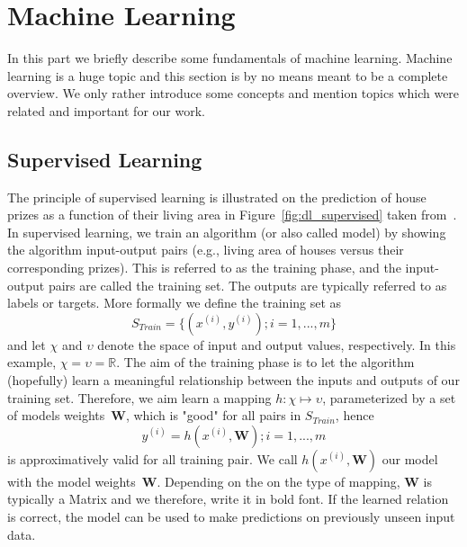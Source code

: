 \section{Machine Learning} \label{sec:intro_mlearn} %
In this part we briefly describe some fundamentals of machine learning. Machine learning is a huge topic and this section is by no means meant to be a complete overview. We only rather introduce some concepts and mention topics which were related and important for our work.

\subsection{Supervised Learning} \label{sec:ml_supervised}
The principle of supervised learning is illustrated on the prediction of house prizes as a function of their living area in Figure~\ref{fig:dl_supervised} taken from~\cite{Ng2012StanfordNotes}. In supervised learning, we train an algorithm (or also called model) by showing the algorithm input-output pairs (e.g., living area of houses versus their corresponding prizes). This is referred to as the training phase, and the input-output pairs are called the training set. The outputs are typically referred to as labels or targets. More formally we define the training set as
\begin{equation}
   S_{Train} = \{(x^{(i)}, y^{(i)}); i = 1,...,m\}
   \label{eq:training_set}
\end{equation}
and let $\chi$ and $\upsilon$ denote the space of input and output values, respectively. In this example, $\chi = \upsilon = \mathbb{R}$. The aim of the training phase is to let the algorithm (hopefully) learn a meaningful relationship between the inputs and outputs of our training set. Therefore, we aim learn a mapping $h : \chi \mapsto \upsilon$, parameterized by a set of models weights~$\textbf{W}$, which is "good" for all pairs in $S_{Train}$, hence
\begin{equation}
   y^{(i)} = h(x^{(i)}, \mathbf{W}); i = 1,...,m
   \label{eq:model}
\end{equation}
is approximatively valid for all training pair. We call $h(x^{(i)}, \mathbf{W})$ our model with the model weights~$\textbf{W}$. Depending on the on the type of mapping, $\mathbf{W}$ is typically a Matrix and we therefore, write it in bold font. If the learned relation is correct, the model can be used to make predictions on previously unseen input data.\\
